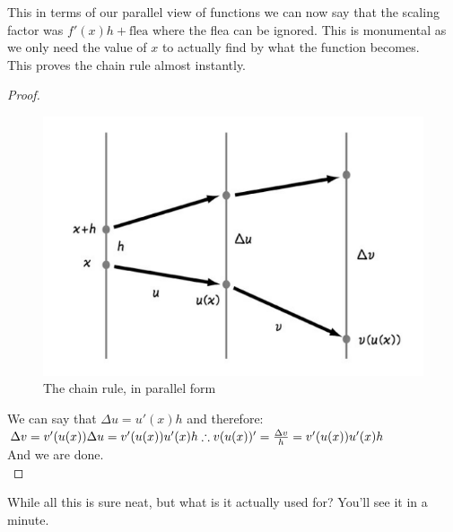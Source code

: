 This in terms of our parallel view of functions we can now say that the scaling factor was $f'(x)h+\text{flea}$ where the flea can be ignored. This is monumental as we only need the value of $x$ to actually find by what the function becomes.\\
This proves the chain rule almost instantly.\\
\begin{proof}
    \begin{figure} [h]
    \centering
    \includegraphics[width=0.5\linewidth]{Photos/Chain rule proof.png}
    \caption{The chain rule, in parallel form}
\end{figure}
We can say that $\Delta u= u'(x)h$ and therefore:\\
$\Delta v= v'(u(x))\Delta u\\
=v'(u(x))u'(x)h\\
\therefore v(u(x))'=\frac{\Delta v}{h}=v'(u(x))u'(x)h$\\
And we are done.\\
\end{proof}
While all this is sure neat, but what is it actually used for? You'll see it in a minute.\\
